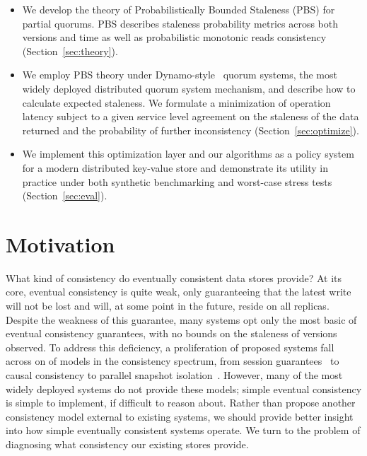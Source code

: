 \documentclass{vldb}
\begin{document}
\begin{itemize}

\item We develop the theory of Probabilistically Bounded
  Staleness (PBS) for partial quorums. PBS describes staleness
  probability metrics across both versions and time as well as
  probabilistic monotonic reads consistency
  (Section~\ref{sec:theory}).

\item We employ PBS theory under Dynamo-style~\cite{dynamo} quorum
  systems, the most widely deployed distributed quorum system
  mechanism, and describe how to calculate expected staleness.  We
  formulate a minimization of operation latency subject to a given
  service level agreement on the staleness of the data returned and
  the probability of further inconsistency
  (Section~\ref{sec:optimize}).

\item We implement this optimization layer and our algorithms as a
  policy system for a modern distributed key-value store and
  demonstrate its utility in practice under both synthetic
  benchmarking and worst-case stress tests (Section~\ref{sec:eval}).

\end{itemize}

\section{Motivation}

What kind of consistency do eventually consistent data stores provide?
At its core, eventual consistency is quite weak, only guaranteeing
that the latest write will not be lost and will, at some point in the
future, reside on all replicas.  Despite the weakness of this
guarantee, many systems opt only the most basic of eventual
consistency guarantees, with no bounds on the staleness of versions
observed.  To address this deficiency, a proliferation of proposed
systems fall across on of models in the consistency spectrum, from
session guarantees~\cite{session} to causal consistency to parallel
snapshot isolation~\cite{psi}.  However, many of the most widely
deployed systems do not provide these models; simple eventual
consistency is simple to implement, if difficult to reason about.
Rather than propose another consistency model external to existing
systems, we should provide better insight into how simple eventually
consistent systems operate.  We turn to the problem of diagnosing what
consistency our existing stores provide.
\end{document}
